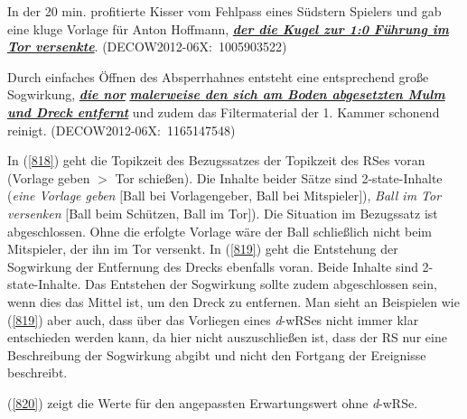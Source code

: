 \begin{exe}
	\ex\label{818} 
	\scriptsize
	In der 20 min. profitierte Kisser vom Fehlpass eines Südstern Spielers und gab eine kluge Vorlage für Anton Hoffmann, 				\underline{\textbf{\textit{der die Kugel zur 1:0 Führung im Tor versenkte}}}.	
	\newline
	\hbox{}\hfill\hbox{(DECOW2012-06X: 1005903522)}
\end{exe}

\begin{exe}
	\ex\label{819} 
	\scriptsize
	Durch einfaches Öffnen des Absperrhahnes entsteht eine entsprechend große Sogwirkung, \underline{\textbf{\textit{die 				nor}}}\- \underline{\textbf{\textit{malerweise den sich am Boden abgesetzten Mulm und Dreck entfernt}}} und zudem das 				Filtermaterial der 1. Kammer schonend reinigt.                                       	
	\hfill\hbox{(DECOW2012-06X: 1165147548)}
\end{exe} 		            							            
In (\ref{818}) geht die Topikzeit des Bezugssatzes der Topikzeit des RSes voran (Vorlage geben $>$ Tor schießen). Die Inhalte beider Sätze sind 2-state-Inhalte (\textit{eine Vorlage geben} $[$Ball bei Vorlagengeber, Ball bei Mitspieler$]$), \textit{Ball im Tor versenken} $[$Ball beim Schützen, Ball im Tor$]$). Die Situation im Bezugssatz ist abgeschlossen. Ohne die erfolgte Vorlage wäre der Ball schließlich nicht beim Mitspieler, der ihn im Tor versenkt. In (\ref{819}) geht die Entstehung der Sogwirkung der Entfernung des Drecks ebenfalls voran. Beide Inhalte sind 2-state-Inhalte. Das Entstehen der Sogwirkung sollte zudem abgeschlossen sein, wenn dies das Mittel ist, um den Dreck zu entfernen. Man sieht an Beispielen wie (\ref{819}) aber auch, dass über das Vorliegen eines \textit{d}-wRSes nicht immer klar entschieden werden kann, da hier nicht auszuschließen ist, dass der RS nur eine Beschreibung der Sogwirkung abgibt und nicht den Fortgang der Ereignisse beschreibt. 

(\ref{820}) zeigt die Werte für den angepassten Erwartungswert ohne \textit{d}-wRSe.

